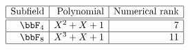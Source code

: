 $$
\begin{array}{|r|r|r|}
\hline
\mbox{Subfield} & \mbox{Polynomial} & \mbox{Numerical rank} \\
\hline
\hline
\bbF_{4}  & X^{2} + X + 1& 7\\
\hline
\bbF_{8}  & X^{3} + X + 1& 11\\
\hline
\end{array}
$$
